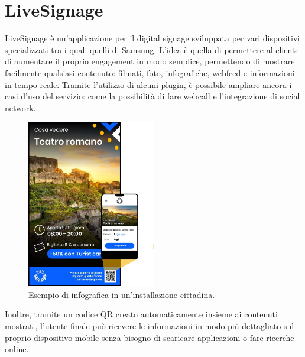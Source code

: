 \section{LiveSignage}

LiveSignage è un’applicazione per il digital signage sviluppata per vari dispositivi specializzati tra i quali quelli di Samsung. L’idea è quella di permettere al cliente di aumentare il proprio engagement  in modo semplice, permettendo di mostrare  facilmente qualsiasi contenuto: filmati, foto, infografiche, webfeed e informazioni in tempo reale. Tramite l'utilizzo di alcuni plugin, è possibile ampliare ancora i casi d'uso  del servizio: come la possibilità di fare webcall e l'integrazione di social network.

\begin{figure}[!htb]
    \centering
    \includegraphics[width= 0.5\textwidth]{images/Introduzione/LiveTurist.jpg} 
    \caption{Esempio di infografica in un'installazione cittadina.} 
\end{figure}

Inoltre, tramite un codice QR creato automaticamente insieme ai contenuti mostrati, l'utente finale può ricevere le informazioni in modo più dettagliato sul proprio dispositivo mobile senza bisogno di scaricare applicazioni o fare ricerche online. 

